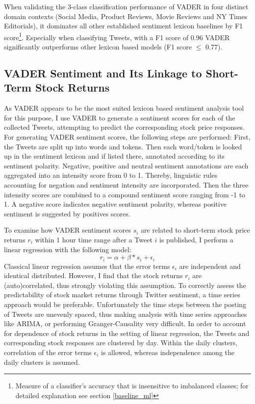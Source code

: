 \documentclass[a4paper,12pt]{article}%
\begin{document}
When validating the 3-class classification performance of VADER in four distinct domain contexts (Social Media, Product Reviews, Movie Reviews and NY Times Editorials), it dominates all other established sentiment lexicon baselines by F1 score\footnote{Measure of a classifier's accuracy that is insensitive to imbalanced classes; for detailed explanation see section \ref{baseline_ml}}. Especially when classifying Tweets, with a F1 score of 0.96 VADER significantly outperforms other lexicon based models (F1 score $\leq$ 0.77).

\newpage
\subsection{VADER Sentiment and Its Linkage to Short-Term Stock Returns \label{vader_short_term}}

As VADER appears to be the most suited lexicon based sentiment analysis tool for this purpose, I use VADER to generate a sentiment scores for each of the collected Tweets, attempting to predict the corresponding stock price responses. For generating VADER sentiment scores, the following steps are performed: First, the Tweets are split up into words and tokens. Then each word/token is looked up in the sentiment lexicon and if listed there, annotated according to its sentiment polarity. Negative, positive and neutral sentiment annotations are each aggregated into an intensity score from 0 to 1. Thereby, linguistic rules accounting for negation and sentiment intensity are incorporated. Then the three intensity scores are combined to a compound sentiment score ranging from -1 to 1. A negative score indicates negative sentiment polarity, whereas positive sentiment is suggested by positives scores.

To examine how VADER sentiment scores $s_i$ are related to short-term stock price returns $r_i$ within 1 hour time range after a Tweet $i$ is published, I perform a linear regression with the following model:
\begin{equation}
r_i = \alpha + \beta * s_i + \epsilon_i \label{OLS_formula}
\end{equation} 
Classical linear regression assumes that the error terms $\epsilon_i$ are independent and identical distributed. However, I find that the stock returns $r_i$ are (auto)correlated, thus strongly violating this assumption. To correctly assess the predictability of stock market returns through Twitter sentiment, a time series approach would be preferable. Unfortunately the time steps between the posting of Tweets are unevenly spaced, thus making analysis with time series approaches like ARIMA, or performing Granger-Causality very difficult. 
In order to account for dependence of stock returns in the setting of linear regression, the Tweets and corresponding stock responses are clustered by day. Within the daily clusters, correlation of the error terms $\epsilon_i$ is allowed, whereas independence among the daily clusters is assumed.
\end{document}

